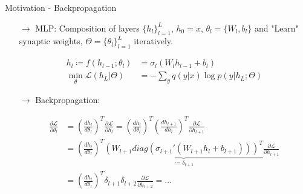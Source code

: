 \documentclass[dvipsnames, usenames]{beamer}
\begin{document}
\begin{frame}{Motivation - Backpropagation}

\begin{itemize}
	\item[$\rightarrow$] MLP: Composition of layers $\{h_l\}_{l=1}^L$, $h_0 = x$, $\theta_l =\{W_l, b_l\}$ and "Learn" synaptic weights, $\Theta = \{\theta_l\}_{l=1}^L$ iteratively. 
	\vspace{-0.5cm}

\begin{align*}
h_l \coloneqq f(h_{l-1}; \theta_l) &= \sigma_l (W_l h_{l-1} + b_l)\\
\min_\theta \mathcal{L}(h_L|\Theta) &= - \sum_y q(y|x) \log p(y|h_L; \Theta)
\end{align*}
	\pause
	\item[$\rightarrow$] Backpropagation:
	\vspace{-0.5cm}

\begin{align*}
	\frac{\partial \mathcal{L}}{\partial \theta_l} &= \left(\frac{dh_{l}}{d \theta_{l}}\right)^T \frac{\partial \mathcal{L}}{\partial h_{l}} = \left(\frac{dh_{l}}{d \theta_{l}}\right)^T \left(\frac{dh_{l+1}}{d h_{l}}\right)^T \frac{\partial \mathcal{L}}{\partial h_{l+1}} \\ 
	&=  \left(\frac{dh_{l}}{d \theta_{l}}\right)^T \underbrace{\left(W_{l+1} diag\left(\sigma_{l+1}'(W_{l+1}h_l +b_{l+1})\right)\right)^T}_{\coloneqq \delta_{l+1}} \frac{\partial \mathcal{L}}{\partial h_{l+1}} \\
	&= \left(\frac{dh_{l}}{d \theta_{l}}\right)^T \delta_{l+1} \delta_{l+2}\frac{\partial \mathcal{L}}{\partial h_{l+2}} = \dots
\end{align*}
\end{itemize}
\end{frame}
\end{document}
